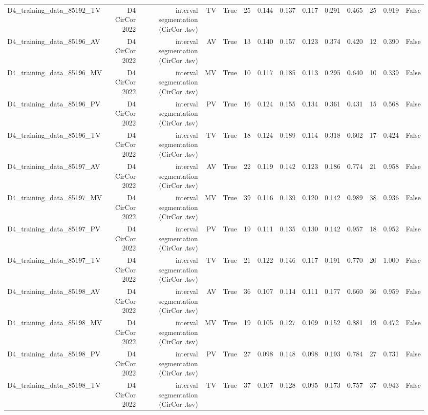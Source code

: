 \begin{table}[htbp]
\begin{tabular}{lrrrrrrrrrrrrr}
    D4\_training\_data\_85192\_TV & D4 CirCor 2022 & interval segmentation (CirCor .tsv) & TV & True & 25 & 0.144 & 0.137 & 0.117 & 0.291 & 0.465 & 25 & 0.919 & False \\
    D4\_training\_data\_85196\_AV & D4 CirCor 2022 & interval segmentation (CirCor .tsv) & AV & True & 13 & 0.140 & 0.157 & 0.123 & 0.374 & 0.420 & 12 & 0.390 & False \\
    D4\_training\_data\_85196\_MV & D4 CirCor 2022 & interval segmentation (CirCor .tsv) & MV & True & 10 & 0.117 & 0.185 & 0.113 & 0.295 & 0.640 & 10 & 0.339 & False \\
    D4\_training\_data\_85196\_PV & D4 CirCor 2022 & interval segmentation (CirCor .tsv) & PV & True & 16 & 0.124 & 0.155 & 0.134 & 0.361 & 0.431 & 15 & 0.568 & False \\
    D4\_training\_data\_85196\_TV & D4 CirCor 2022 & interval segmentation (CirCor .tsv) & TV & True & 18 & 0.124 & 0.189 & 0.114 & 0.318 & 0.602 & 17 & 0.424 & False \\
    D4\_training\_data\_85197\_AV & D4 CirCor 2022 & interval segmentation (CirCor .tsv) & AV & True & 22 & 0.119 & 0.142 & 0.123 & 0.186 & 0.774 & 21 & 0.958 & False \\
    D4\_training\_data\_85197\_MV & D4 CirCor 2022 & interval segmentation (CirCor .tsv) & MV & True & 39 & 0.116 & 0.139 & 0.120 & 0.142 & 0.989 & 38 & 0.936 & False \\
    D4\_training\_data\_85197\_PV & D4 CirCor 2022 & interval segmentation (CirCor .tsv) & PV & True & 19 & 0.111 & 0.135 & 0.130 & 0.142 & 0.957 & 18 & 0.952 & False \\
    D4\_training\_data\_85197\_TV & D4 CirCor 2022 & interval segmentation (CirCor .tsv) & TV & True & 21 & 0.122 & 0.146 & 0.117 & 0.191 & 0.770 & 20 & 1.000 & False \\
    D4\_training\_data\_85198\_AV & D4 CirCor 2022 & interval segmentation (CirCor .tsv) & AV & True & 36 & 0.107 & 0.114 & 0.111 & 0.177 & 0.660 & 36 & 0.959 & False \\
    D4\_training\_data\_85198\_MV & D4 CirCor 2022 & interval segmentation (CirCor .tsv) & MV & True & 19 & 0.105 & 0.127 & 0.109 & 0.152 & 0.881 & 19 & 0.472 & False \\
    D4\_training\_data\_85198\_PV & D4 CirCor 2022 & interval segmentation (CirCor .tsv) & PV & True & 27 & 0.098 & 0.148 & 0.098 & 0.193 & 0.784 & 27 & 0.731 & False \\
    D4\_training\_data\_85198\_TV & D4 CirCor 2022 & interval segmentation (CirCor .tsv) & TV & True & 37 & 0.107 & 0.128 & 0.095 & 0.173 & 0.757 & 37 & 0.943 & False \\

\end{tabular}
\end{table}
